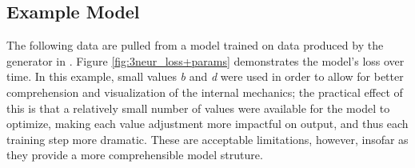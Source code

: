 \subsection{Example Model}
\label{subsec:3neurex}
The following data are pulled from a model trained on data produced by the 
generator in . Figure 
\ref{fig:3neur_loss+params} demonstrates the model's loss over time. In this 
example, small values \textit{b} and \textit{d} were used in order to allow for 
better comprehension and visualization of the internal mechanics; the practical 
effect of this is that a relatively small number of values were available for 
the model to optimize, making each value adjustment more impactful on output, 
and thus each training step more dramatic. These are acceptable limitations, 
however, insofar as they provide a more comprehensible model struture.



